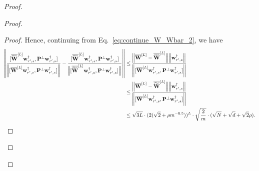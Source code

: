 \begin{claim}
\begin{proof}
\begin{proof}
\begin{proof}
						Hence, continuing from Eq.~\ref{eq:continue_W_Wbar_2}, we have
						\begin{align*}
							\norm{\frac{[\overline{\widetilde{\mathbf{W}}}^{[L]} \mathbf{w}_{r', s}^{\dagger}, \mathbf{P}^{\perp}\mathbf{w}_{r', s}^{\dagger}]}{\norm{[\overline{\mathbf{W}}^{[L]} \mathbf{w}_{r', s}^{\dagger}, \mathbf{P}^{\perp}\mathbf{w}_{r', s}^{\dagger}]}} - \frac{[\overline{\widetilde{\mathbf{W}}}^{[L]} \mathbf{w}_{r', s}^{\dagger}, \mathbf{P}^{\perp}\mathbf{w}_{r', s}^{\dagger}]}{\norm[2]{[\overline{\widetilde{\mathbf{W}}}^{[L]} \mathbf{w}_{r', s}^{\dagger}, \mathbf{P}^{\perp}\mathbf{w}_{r', s}^{\dagger}]}}} &\le  \frac{\norm[2]{\overline{\mathbf{W}}^{[L]} -  \overline{\widetilde{\mathbf{W}}}^{[L]}} \norm{\mathbf{w}_{r', s}^{\dagger} }}
							{\norm{[\overline{\mathbf{W}}^{[L]} \mathbf{w}_{r', s}^{\dagger}, \mathbf{P}^{\perp}\mathbf{w}_{r', s}^{\dagger}]} } \\
							& \le \frac{\norm[2]{\overline{\mathbf{W}}^{[L]} -  \overline{\widetilde{\mathbf{W}}}^{[L]}} \norm{\mathbf{w}_{r', s}^{\dagger} }}
							{\norm{[\overline{\mathbf{W}}^{[L]} \mathbf{w}_{r', s}^{\dagger}, \mathbf{P}^{\perp}\mathbf{w}_{r', s}^{\dagger}]} } \\&
							\le \sqrt{3L} \cdot (2 (\sqrt{2} + \rho m^{-0.5}))^{L} \cdot \sqrt{\frac{2}{m}} \cdot   (\sqrt{N} + \sqrt{d} + \sqrt{2}\rho).
						\end{align*}
						
					\end{proof}
					

\end{proof}
\end{proof}
\end{claim}
